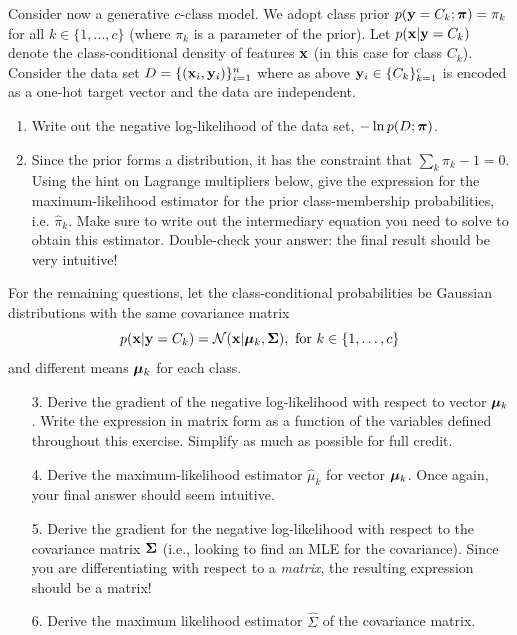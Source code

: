 \documentclass[submit]{harvardml}
\begin{document}
\begin{problem}

  Consider now a generative $c$-class model.  We adopt class prior
  $p(\mathbf{y} = C_k; \boldsymbol{\pi}) = \pi_k$ for all $k \in \{1, \ldots, c\}$
(where $\pi_k$ is a parameter of the prior).
Let  $p(\mathbf{x}|\mathbf{y}=C_k)$ denote
the class-conditional density of features $\mathbf{x}$ (in this
case for class $C_k$). Consider the data set $D = \{(\mathbf{x}_i,
\mathbf{y}_i)\}_{i=1}^n$ where as above $\mathbf{y}_i \in \{C_k\}_{k=1}^c$ is
encoded as a one-hot target vector and the data are independent.

\begin{enumerate}
  \item Write out the negative log-likelihood of the data set, $-\ln p(D ; \boldsymbol{\pi})$.

  \item Since the prior forms a distribution, it has the constraint that
    $\sum_k\pi_k - 1 = 0$.  Using the hint on
Lagrange multipliers below, give the
    expression for the maximum-likelihood estimator for the prior
    class-membership probabilities, i.e.
    $\hat \pi_k.$
    Make sure to write out the intermediary equation you need
    to solve to obtain this estimator. Double-check your answer: the final
    result should be very intuitive!
\end{enumerate}

    For the remaining questions, let the
    class-conditional probabilities be Gaussian distributions with
the same covariance matrix
    $$p(\mathbf{x} | \mathbf{y} = C_k) = \mathcal{N}(\mathbf{x} |  \boldsymbol{\mu}_k, \mathbf{\Sigma}), \text{\ for\ }k \in \{1,\ldots, c\}$$ 
    and different means $\boldsymbol{\mu}_k$ for each class.

    \begin{enumerate}
  \item[3.] Derive the gradient of the negative log-likelihood with respect to vector $\boldsymbol{\mu}_k$.
    Write the expression in matrix form as a function of the variables defined
    throughout this exercise. Simplify as much as possible for full credit.
  \item[4.] Derive the maximum-likelihood estimator $\hat{\mu}_k$ for vector $\boldsymbol{\mu}_k$. Once
    again, your final answer should seem intuitive.
  \item[5.] Derive the gradient for the negative log-likelihood with respect to the
    covariance matrix $\mathbf{\Sigma}$ (i.e., looking
to find an MLE for the covariance).
Since you are differentiating with respect to a
    \emph{matrix}, the resulting expression should be a matrix!
%
  \item[6.] Derive the maximum likelihood estimator $\hat{\Sigma}$ of the covariance matrix.
\end{enumerate}


\end{problem}
\end{document}
